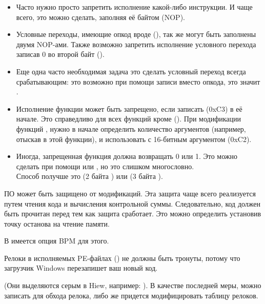 \begin{itemize}

\item Часто нужно просто запретить исполнение какой-либо инструкции.
И чаще всего, это можно сделать, заполняя её байтом 
 (\ac{NOP}).

\item Условные переходы, имеющие опкод вроде  (\JZ), 
так же могут быть заполнены двумя \ac{NOP}-ами.
Также возможно запретить исполнение условного перехода записав 0 во второй байт ().

\item Еще одна часто необходимая задача это сделать условный переход всегда срабатывающим: 
это возможно при помощи записи  
вместо опкода, это значит \JMP.

\item Исполнение функции может быть запрещено, если записать
\RETN (0xC3) в её начале.
Это справедливо для всех функций кроме  
().
При модификации функций , нужно в начале определить количество аргументов 
(например, отыскав \RETN в этой функции),
и использовать \RETN с 16-битным аргументом (0xC2).

\item Иногда, запрещенная функция должна возвращать 0 или 1.
Это можно сделать при помощи  или , 
но это слишком многословно.\\
Способ получше это  (2 байта ) или  (3 байта ).

\end{itemize}

ПО может быть защищено от модификаций.
Эта защита чаще всего реализуется путем чтения кода и вычисления контрольной суммы.
Следовательно, код должен быть прочитан перед тем как защита сработает.
Это можно определить установив точку останова на чтение памяти.

В \tracer имеется опция BPM для этого.

Релоки в исполняемых PE-файлах () 
не должны быть тронуты, потому что загрузчик Windows перезапишет ваш новый код.

(Они выделяются серым в Hiew, например: ).
В качестве последней меры, можно записать \JMP для обхода релока, либо же придется модифицировать таблицу
релоков.


